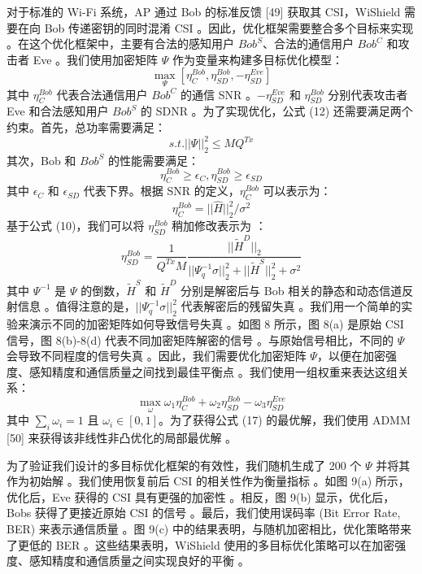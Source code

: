 \documentclass[journal]{IEEEtran}
\begin{document}
对于标准的 Wi-Fi 系统，AP 通过 Bob 的标准反馈 [49] 获取其 CSI，WiShield 需要在向 Bob 传递密钥的同时混淆 CSI 。因此，优化框架需要整合多个目标来实现 。在这个优化框架中，主要有合法的感知用户 $Bob^{S}$、合法的通信用户 $Bob^{C}$ 和攻击者 Eve 。我们使用加密矩阵 $\Psi$ 作为变量来构建多目标优化模型：
\begin{equation}
\max_{\Psi} [\eta_{C}^{Bob}, \eta_{SD}^{Bob}, -\eta_{SD}^{Eve}]
\end{equation}
其中 $\eta_{C}^{Bob}$ 代表合法通信用户 $Bob^{C}$ 的通信 SNR 。$-\eta_{SD}^{Eve}$ 和 $\eta_{SD}^{Bob}$ 分别代表攻击者 Eve 和合法感知用户 $Bob^{S}$ 的 SDNR 。为了实现优化，公式 (12) 还需要满足两个约束。首先，总功率需要满足：
\begin{equation}
s.t. ||\Psi||_{2}^{2}\le MQ^{Tx}
\end{equation}
其次，Bob 和 $Bob^{S}$ 的性能需要满足：
\begin{equation}
\eta_{C}^{Bob}\ge\epsilon_{C}, \eta_{SD}^{Bob}\ge\epsilon_{SD}
\end{equation}
其中 $\epsilon_{C}$ 和 $\epsilon_{SD}$ 代表下界。根据 SNR 的定义，$\eta_{C}^{Bob}$ 可以表示为：
\begin{equation}
\eta_{C}^{Bob}=||\hat{H}||_{2}^{2}/\sigma^{2}
\end{equation}
基于公式 (10)，我们可以将 $\eta_{SD}^{Bob}$ 稍加修改表示为 ：
\begin{equation}
\eta_{SD}^{Bob}=\frac{1}{Q^{Tx}M}\frac{||\tilde{H}^{D}||_{2}}{||\Psi_{q}^{-1}\sigma||_{2}^{2}+||\tilde{H}^{S}||_{2}^{2}+\sigma^{2}}
\end{equation}
其中 $\Psi^{-1}$ 是 $\Psi$ 的倒数，$\tilde{H}^{S}$ 和 $\tilde{H}^{D}$ 分别是解密后与 Bob 相关的静态和动态信道反射信息 。值得注意的是，$||\Psi_{q}^{-1}\sigma||_{2}^{2}$ 代表解密后的残留失真 。我们用一个简单的实验来演示不同的加密矩阵如何导致信号失真 。如图 8 所示，图 8(a) 是原始 CSI 信号，图 8(b)-8(d) 代表不同加密矩阵解密的信号 。与原始信号相比，不同的 $\Psi$ 会导致不同程度的信号失真 。因此，我们需要优化加密矩阵 $\Psi$，以便在加密强度、感知精度和通信质量之间找到最佳平衡点 。我们使用一组权重来表达这组关系：
\begin{equation}
\max_{\omega} \omega_{1}\eta_{C}^{Bob}+\omega_{2}\eta_{SD}^{Bob}-\omega_{3}\eta_{SD}^{Eve}
\end{equation}
其中 $\sum_{i}\omega_{i}=1$ 且 $\omega_{i}\in[0,1]$。为了获得公式 (17) 的最优解，我们使用 ADMM [50] 来获得该非线性非凸优化的局部最优解 。

为了验证我们设计的多目标优化框架的有效性，我们随机生成了 200 个 $\Psi$ 并将其作为初始解 。我们使用恢复前后 CSI 的相关性作为衡量指标 。如图 9(a) 所示，优化后，Eve 获得的 CSI 具有更强的加密性 。相反，图 9(b) 显示，优化后，Bobs 获得了更接近原始 CSI 的信号 。最后，我们使用误码率 (Bit Error Rate, BER) 来表示通信质量 。图 9(c) 中的结果表明，与随机加密相比，优化策略带来了更低的 BER 。这些结果表明，WiShield 使用的多目标优化策略可以在加密强度、感知精度和通信质量之间实现良好的平衡 。
\end{document}
